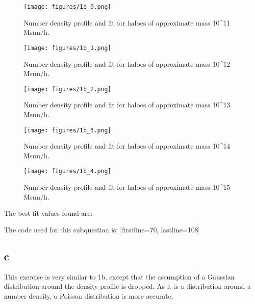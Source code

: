 \begin{figure}
    \centering
    \texttt{[image: figures/1b\_0.png]}
    \caption{Number density profile and fit for haloes of approximate mass 10^11 Msun/h.}
    \label{fig:ex1b_0}
\end{figure}
\begin{figure}
    \centering
    \texttt{[image: figures/1b\_1.png]}
    \caption{Number density profile and fit for haloes of approximate mass 10^12 Msun/h.}
    \label{fig:ex1b_1}
\end{figure}
\begin{figure}
    \centering
    \texttt{[image: figures/1b\_2.png]}
    \caption{Number density profile and fit for haloes of approximate mass 10^13 Msun/h.}
    \label{fig:ex1b_2}
\end{figure}
\begin{figure}
    \centering
    \texttt{[image: figures/1b\_3.png]}
    \caption{Number density profile and fit for haloes of approximate mass 10^14 Msun/h.}
    \label{fig:ex1b_3}
\end{figure}
\begin{figure}
    \centering
    \texttt{[image: figures/1b\_4.png]}
    \caption{Number density profile and fit for haloes of approximate mass 10^15 Msun/h.}
    \label{fig:ex1b_4}
\end{figure}

The best fit values found are:


The code used for this subquestion is:
[firstline=70, lastline=108]

\subsection*{c}
This exercise is very similar to 1b, except that the assumption of a Gaussian distribution around the density profile is dropped.
As it is a distribution around a number density, a Poisson distribution is more accurate.

